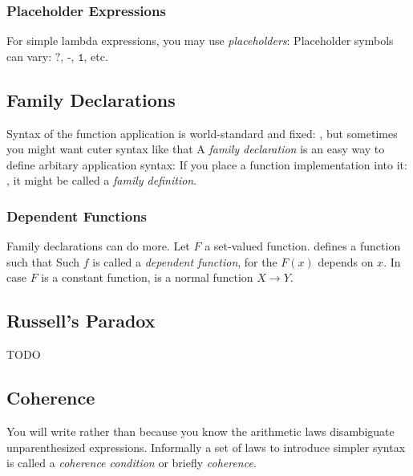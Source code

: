 \subsubsection{Placeholder Expressions}

For simple lambda expressions, you may use \emph{placeholders}:
Placeholder symbols can vary: $\texttt{?}$, $\texttt{-}$, $\texttt{1}$, etc.


\subsection{Family Declarations}

Syntax of the function application is world-standard and fixed:
, but sometimes you might want cuter syntax like that
A \emph{family declaration} is an easy way to define arbitary application syntax:
If you place a function implementation into it:
, it might be called a \emph{family definition}.


\subsubsection{Dependent Functions}

Family declarations can do more. Let $F$ a set-valued function.
defines a function
such that
Such $f$ is called a \emph{dependent function}, for the $F(x)$ depends on $x$. %
In case $F$ is a constant function,
is a normal function $X \to Y$. 

\subsection{Russell's Paradox}
TODO

\subsection{Coherence}

You will write
rather than
because you know the arithmetic laws
disambiguate unparenthesized expressions.
Informally a set of laws to introduce simpler syntax is called a \emph{coherence condition} or briefly \emph{coherence}.

